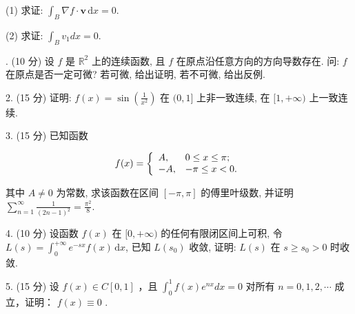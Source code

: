 \documentclass{examcollection}
\renewcommand{\displayformula}[1]{\[#1\]}
\begin{document}
{\begin{minipage}{\textwidth}
(1) 求证: $\int_{B} \nabla f \cdot \boldsymbol{v} \, \mathrm{d}x = 0$.\par
(2) 求证:  $\int_{B} v_{1} dx = 0.$\par
{}. (10 分) 设 $f$ 是 $\mathbb{R}^2$ 上的连续函数, 且 $f$ 在原点沿任意方向的方向导数存在. 问: $f$ 在原点是否一定可微? 若可微, 给出证明, 若不可微, 给出反例.\par
2. (15 分) 证明: $f(x) = \sin \left( \frac{1}{x^2} \right)$ 在 $(0,1]$ 上非一致连续, 在 $[1, +\infty)$ 上一致连续.\par
3. (15 分) 已知函数\par
\displayformula{f (x) = \left\{ \begin{array}{l l} A, & 0 \leq x \leq \pi ; \\ - A, & - \pi \leq x <   0. \end{array} \right.}\par
其中 $A \neq 0$ 为常数, 求该函数在区间 $[- \pi, \pi]$ 的傅里叶级数, 并证明 $\sum_{n=1}^{\infty} \frac{1}{(2n-1)^2} = \frac{\pi^2}{8}$.\par
4. (10 分) 设函数 $f(x)$ 在 $[0, +\infty)$ 的任何有限闭区间上可积, 令 $L(s) = \int_{0}^{+\infty} e^{-sx} f(x) \, \mathrm{d}x$, 已知 $L(s_0)$ 收敛, 证明: $L(s)$ 在 $s \geq s_0 > 0$ 时收敛.\par
5. (15 分) 设  $f(x) \in C[0,1]$ ，且  $\int_{0}^{1} f(x)e^{nx} dx = 0$  对所有  $n = 0, 1, 2, \cdots$  成立，证明： $f(x) \equiv 0$ .\par
\end{minipage}}
\ifdim\dimexpr\ht\proofbox+\dp\proofbox\relax>\textheight
\noindent\resizebox{!}{\textheight}{\usebox{\proofbox}}\else\noindent\usebox{\proofbox}\fi\clearpage
\end{document}

